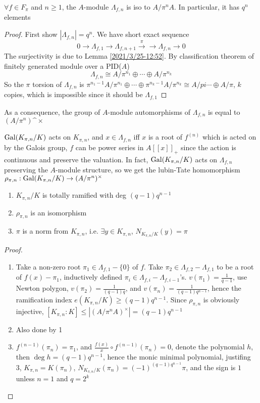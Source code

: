 \documentclass[main]{subfiles}
\begin{document}
\begin{proposition}
$\forall f\in F_\pi$ and $n\geq1$, the $A$-module $\Lambda_{f,n}$ is iso to $A/\pi^nA$. In particular, it has $q^n$ elements
\end{proposition}

\begin{proof}
First show $|\Lambda_{f,n}|=q^n$. We have short exact sequence
\[0\to\Lambda_{f,1}\to\Lambda_{f,n+1}\xrightarrow{\pi}\to\Lambda_{f,n}\to0\]
The surjectivity is due to Lemma \ref{2021/3/25-12:52}. By classification theorem of finitely generated module over a PID($A$)
\[\Lambda_{f,n}\cong A/\pi^{n_1}\oplus\cdots\oplus A/\pi^{n_k}\]
So the $\pi$ torsion of $\Lambda_{f,n}$ is $\pi^{n_1-1}A/\pi^{n_1}\oplus\cdots\oplus \pi^{n_k-1}A/\pi^{n_k}\cong A/pi\cdots\oplus A/\pi$, $k$ copies, which is impossible since it should be $\Lambda_{f,1}$
\end{proof}

As a consequence, the group of $A$-module automorphisms of $\Lambda_{f,n}$ is equal to $(A/\pi^n)\^\times$

$\operatorname{Gal}(K_{\pi,n}/K)$ acts on $K_{\pi,n}$, and $x\in\Lambda_{f,n}$ iff $x$ is a root of $f^{(n)}$ which is acted on by the Galois group, $f$ can be power series in $A[[x]]_+$ since the action is continuous and preserve the valuation. In fact, $\operatorname{Gal}(K_{\pi,n}/K)$ acts on $\Lambda_{f,n}$ preserving the $A$-module structure, so we get the lubin-Tate homomorphism $\rho_{\pi,n}:\operatorname{Gal}(K_{\pi,n}/K)\to(A/\pi^n)^\times$

\begin{theorem}
\begin{enumerate}
\item $K_{\pi,n}/K$ is totally ramified with deg $(q-1)q^{n-1}$
\item $\rho_{\pi,n}$ is an isomorphism
\item $\pi$ is a norm from $K_{\pi,n}$, i.e. $\exists y\in K_{\pi,n}$, $N_{K_{\pi,n}/K}(y)=\pi$
\end{enumerate}
\end{theorem}

\begin{proof}
\begin{enumerate}
\item Take a non-zero root $\pi_1\in\Lambda_{f,1}-\{0\}$ of $f$. Take $\pi_2\in\Lambda_{f,2}-\Lambda_{f,1}$ to be a root of $f(x)-\pi_1$, inductively defined $\pi_i\in\Lambda_{f,i}-\Lambda_{f,i-1}$'s. $v(\pi_1)=\frac{1}{q-1}$, use Newton polygon, $v(\pi_2)=\frac{1}{(q-1)q}$, and $v(\pi_n)=\frac{1}{(q-1)q^{n-1}}$, hence the ramification index $e(K_{\pi,n}/K)\geq(q-1)q^{n-1}$. Since $\rho_{\pi,n}$ is obviously injective, $[K_{\pi,n}:K]\leq|(A/\pi^nA)^\times|=(q-1)q^{n-1}$
\item Also done by 1
\item $f^{(n-1)}(\pi_n)=\pi_1$, and $\frac{f(x)}{x}\circ f^{(n-1)}(\pi_n)=0$, denote the polynomial $h$, then $\deg h=(q-1)q^{n-1}$, hence the monic minimal polynomial, justifing 3, $K_{\pi,n}=K(\pi_n)$, $N_{K_{\pi,n}/K}(\pi_n)=(-1)^{(q-1)q^{n-1}}\pi$, and the sign is $1$ unless $n=1$ and $q=2^k$
\end{enumerate}
\end{proof}
\end{document}
